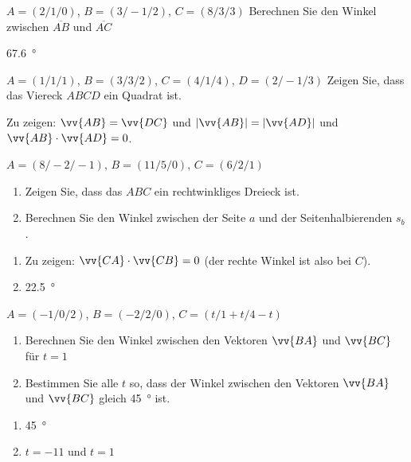 \begin{exercisesKapitel}
\begin{exercise}
$A=(2/1/0)$, $B=(3/-1/2)$, $C=(8/3/3)$  \newline Berechnen Sie den Winkel zwischen $\overline{AB}$ und $\overline{AC}$
\begin{answer}
\SI{67.6}{\degree}
\end{answer}
\end{exercise}

\begin{exercise}
$A=(1/1/1)$, $B=(3/3/2)$, $C=(4/1/4)$, $D=(2/-1/3)$  \newline Zeigen Sie, dass das Viereck $ABCD$ ein Quadrat ist.
\begin{answer}
Zu zeigen: $\vv{AB} = \vv{DC}$  und $|\vv{AB}| = |\vv{AD}|$ und $\vv{AB} \cdot \vv{AD} = 0$.
\end{answer}
\end{exercise}

\begin{exercise}
$A=(8/-2/-1)$, $B=(11/5/0)$, $C=(6/2/1)$ \newline
\begin{enumerate}
\item Zeigen Sie, dass das $ABC$ ein rechtwinkliges Dreieck ist.
\item Berechnen Sie den Winkel zwischen der Seite $a$ und der Seitenhalbierenden $s_{b}$.
\end{enumerate}
\begin{answer}
\begin{enumerate}
\item Zu zeigen: $\vv{CA} \cdot \vv{CB} = 0$ (der rechte Winkel ist also bei $C$).
\item \SI{22.5}{\degree}
\end{enumerate}
\end{answer}
\end{exercise}

\begin{exercise}
$A=(-1/0/2)$, $B=(-2/2/0)$, $C=(t/1+t/4-t)$ \newline
\begin{enumerate}
\item Berechnen Sie den Winkel zwischen den Vektoren $\vv{BA}$ und $\vv{BC}$ für $t=1$
\item Bestimmen Sie alle $t$ so, dass der Winkel zwischen den Vektoren $\vv{BA}$ und $\vv{BC}$ gleich \SI{45}{\degree} ist.
\end{enumerate}
\begin{answer}
\begin{enumerate}
\item \SI{45}{\degree}
\item $t=-11$ und $t=1$
\end{enumerate}
\end{answer}
\end{exercise}


\end{exercisesKapitel}
